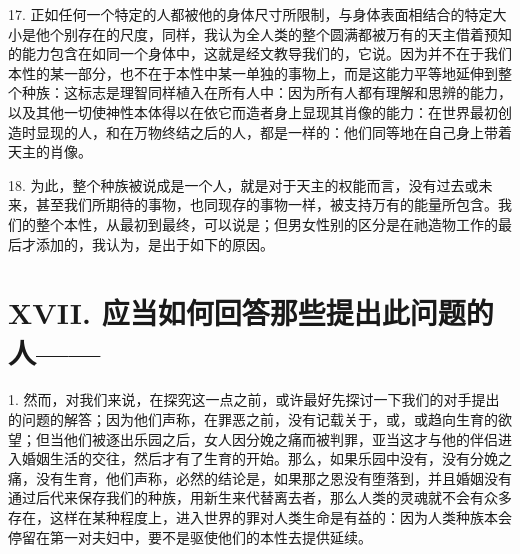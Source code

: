 17. 正如任何一个特定的人都被他的身体尺寸所限制，与身体表面相结合的特定大小是他个别存在的尺度，同样，我认为全人类的整个圆满都被万有的天主借着预知的能力包含在如同一个身体中，这就是经文教导我们的，它说。因为并不在于我们本性的某一部分，也不在于本性中某一单独的事物上，而是这能力平等地延伸到整个种族：这标志是理智同样植入在所有人中：因为所有人都有理解和思辨的能力，以及其他一切使神性本体得以在依它而造者身上显现其肖像的能力：在世界最初创造时显现的人，和在万物终结之后的人，都是一样的：他们同等地在自己身上带着天主的肖像。\par

18. 为此，整个种族被说成是一个人，就是对于天主的权能而言，没有过去或未来，甚至我们所期待的事物，也同现存的事物一样，被支持万有的能量所包含。我们的整个本性，从最初到最终，可以说是；但男女性别的区分是在祂造物工作的最后才添加的，我认为，是出于如下的原因。\par


\section{XVII. 应当如何回答那些提出此问题的人——}

1. 然而，对我们来说，在探究这一点之前，或许最好先探讨一下我们的对手提出的问题的解答；因为他们声称，在罪恶之前，没有记载关于，或，或趋向生育的欲望；但当他们被逐出乐园之后，女人因分娩之痛而被判罪，亚当这才与他的伴侣进入婚姻生活的交往，然后才有了生育的开始。那么，如果乐园中没有，没有分娩之痛，没有生育，他们声称，必然的结论是，如果那之恩没有堕落到，并且婚姻没有通过后代来保存我们的种族，用新生来代替离去者，那么人类的灵魂就不会有众多存在，这样在某种程度上，进入世界的罪对人类生命是有益的：因为人类种族本会停留在第一对夫妇中，要不是驱使他们的本性去提供延续。\par

